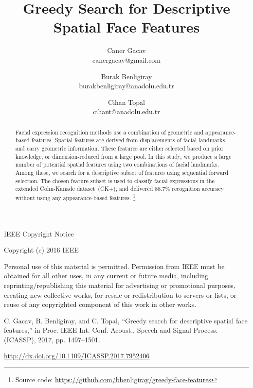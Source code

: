 \documentclass[hyperfootnotes=false]{article}
\newcommand\blfootnote[1]{%
	\begingroup
	\renewcommand\thefootnote{}\footnote{#1}%
	\addtocounter{footnote}{-1}%
	\endgroup
}
\begin{document}
	
\begin{Huge}
IEEE Copyright Notice
\end{Huge}

\vspace{\baselineskip}

Copyright (c) 2016 IEEE

Personal use of this material is permitted.
Permission from IEEE must be obtained for all other	uses, in any current or future media, including reprinting/republishing this material for advertising or promotional purposes, creating new collective works, for resale or redistribution to servers or lists, or reuse of any copyrighted component of this work in other works.

\vspace{\baselineskip}

C. Gacav, B. Benligiray, and C. Topal, “Greedy search for descriptive spatial face features,” in Proc. IEEE Int. Conf. Acoust., Speech and Signal Process. (ICASSP), 2017, pp. 1497--1501.

\vspace{\baselineskip}

\url{http://dx.doi.org/10.1109/ICASSP.2017.7952406}


\newpage
	
\title{Greedy Search for Descriptive Spatial Face Features}
	
\author{Caner Gacav \\ canergacav@gmail.com \and Burak Benligiray \\ burakbenligiray@anadolu.edu.tr \and Cihan Topal \\ cihant@anadolu.edu.tr}

\date{}
	
\maketitle

\begin{abstract}
Facial expression recognition methods use a combination of geometric and appearance-based features.
Spatial features are derived from displacements of facial landmarks, and carry geometric information.
These features are either selected based on prior knowledge, or dimension-reduced from a large pool.
In this study, we produce a large number of potential spatial features using two combinations of facial landmarks.
Among these, we search for a descriptive subset of features using sequential forward selection.
The chosen feature subset is used to classify facial expressions in the extended Cohn-Kanade dataset~(CK+), and delivered 88.7\% recognition accuracy without using any appearance-based features.
\blfootnote{Source code: \url{https://github.com/bbenligiray/greedy-face-features}}
\end{abstract}
\end{document}
